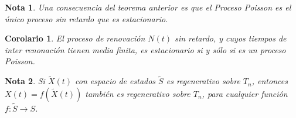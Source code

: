 \documentclass{article}
\newtheorem{Note}{Nota}
\newtheorem{Coro}{Corolario}
\begin{document}
\begin{Note}
Una consecuencia del teorema anterior es que el Proceso Poisson es el \'unico proceso sin retardo que es estacionario.
\end{Note}

\begin{Coro}
El proceso de renovaci\'on $N\left(t\right)$ sin retardo, y cuyos tiempos de inter renonaci\'on tienen media finita, es estacionario si y s\'olo si es un proceso Poisson.

\end{Coro}






\begin{Note}
Si $\tilde{X}\left(t\right)$ con espacio de estados $\tilde{S}$ es regenerativo sobre $T_{n}$, entonces $X\left(t\right)=f\left(\tilde{X}\left(t\right)\right)$ tambi\'en es regenerativo sobre $T_{n}$, para cualquier funci\'on $f:\tilde{S}\rightarrow S$.
\end{Note}
\end{document}
